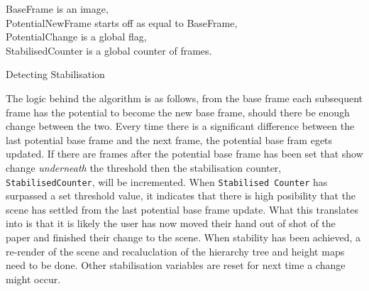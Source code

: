\documentclass[11pt]{article}
\begin{document}
\begin{algorithm}[H]
\DontPrintSemicolon
BaseFrame is an image,\\
PotentialNewFrame starts off as equal to BaseFrame,\\
PotentialChange is a global flag,\\
StabilisedCounter is a global counter of frames.

\caption{Detecting Stabilisation}
\label{algo:stabilisation}
\end{algorithm}

The logic behind the algorithm is as follows, from the base frame
each subsequent frame has the potential to become the new base frame, should
there be enough change between the two. Every time there is a significant 
difference between the last potential base frame and the next frame, the
potential base fram egets updated. If there are frames after the potential
base frame has been set that show change \textit{underneath} the threshold
then the stabilisation counter, \texttt{StabilisedCounter}, will be 
incremented. When \texttt{Stabilised Counter} has surpassed a set threshold
value, it indicates that there is high posibility that the scene has
settled from the last potential base frame update. What this translates
into is that it is likely the user has now moved their hand out of shot of the
paper and finished their change to the scene. When stability has been
achieved, a re-render of the scene and recaluclation of the hierarchy tree 
and height maps need to be done. Other stabilisation variables are reset for
next time a change might occur.
\end{document}
